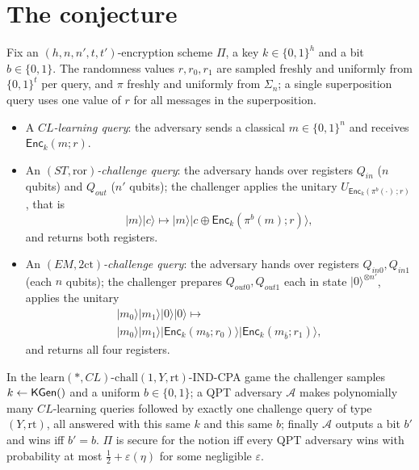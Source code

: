 \documentclass{aicr-conjecture}
\newcommand{\KGen}{\mathsf{KGen}}
\newcommand{\Enc}{\mathsf{Enc}}
\newcommand{\ror}{\mathrm{ror}}
\newcommand{\twoct}{2\mathrm{ct}}
\newcommand{\learn}{\mathrm{learn}}
\newcommand{\chall}{\mathrm{chall}}
\newcommand{\ket}[1]{|#1\rangle}
\begin{document}
\section{The conjecture}\label{sec:conjectures}

\begin{definition}\label{def:queries}
Fix an $(h,n,n',t,t')$-encryption scheme $\Pi$, a key
$k\in\{0,1\}^{h}$ and a bit $b\in\{0,1\}$. The randomness values
$r,r_0,r_1$ are sampled freshly and uniformly from $\{0,1\}^{t}$ per
query, and $\pi$ freshly and uniformly from $\Sigma_n$; a single
superposition query uses one value of $r$ for all messages in the
superposition.
\begin{itemize}
  \item A \emph{$CL$-learning query}: the adversary sends a classical
    $m\in\{0,1\}^{n}$ and receives $\Enc_k(m;r)$.
  \item An \emph{$(ST,\ror)$-challenge query}: the adversary hands over
    registers $Q_{in}$ ($n$ qubits) and $Q_{out}$ ($n'$ qubits); the
    challenger applies the unitary $U_{\Enc_k(\pi^{b}(\cdot)\,;r)}$,
    that is
    \[
      \ket{m}\ket{c}\mapsto\ket{m}\ket{c\oplus\Enc_k(\pi^{b}(m);r)},
    \]
    and returns both registers.
  \item An \emph{$(EM,\twoct)$-challenge query}: the adversary hands
    over registers $Q_{in0},Q_{in1}$ (each $n$ qubits); the challenger
    prepares $Q_{out0},Q_{out1}$ each in state $\ket{0}^{\otimes n'}$,
    applies the unitary
    \begin{multline*}
      \ket{m_0}\ket{m_1}\ket{0}\ket{0}\mapsto\\
      \ket{m_0}\ket{m_1}
        \ket{\Enc_k(m_b;r_0)}\ket{\Enc_k(m_{\bar b};r_1)},
    \end{multline*}
    and returns all four registers.
\end{itemize}
\end{definition}

\begin{definition}\label{def:indcpa}
In the $\learn(*,CL)$-$\chall(1,Y,\mathrm{rt})$-IND-CPA game the
challenger samples $k\sample\KGen()$ and a uniform $b\in\{0,1\}$; a QPT
adversary $\mathcal{A}$ makes polynomially many $CL$-learning queries
followed by exactly one challenge query of type $(Y,\mathrm{rt})$, all
answered with this same $k$ and this same $b$; finally $\mathcal{A}$
outputs a bit $b'$ and wins iff $b'=b$. $\Pi$ is secure for the notion
iff every QPT adversary wins with probability at most
$\tfrac12+\varepsilon(\eta)$ for some negligible $\varepsilon$.
\end{definition}
\end{document}
